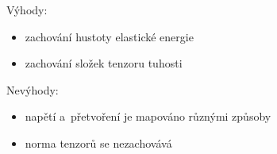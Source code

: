 Výhody:
\begin{itemize}
	\item zachování hustoty elastické energie
	\item zachování složek tenzoru tuhosti
\end{itemize}

Nevýhody:
\begin{itemize}
	\item napětí a~přetvoření je mapováno různými způsoby
	\item norma tenzorů se nezachovává
\end{itemize}

